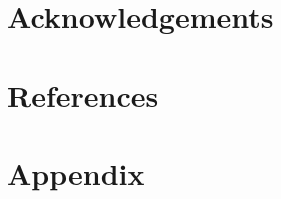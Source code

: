 \documentclass[11pt]{article}
\begin{document}
\section{Acknowledgements}

\section{References}




\appendix

\section{Appendix}
\label{sec:appendix}
\end{document}
